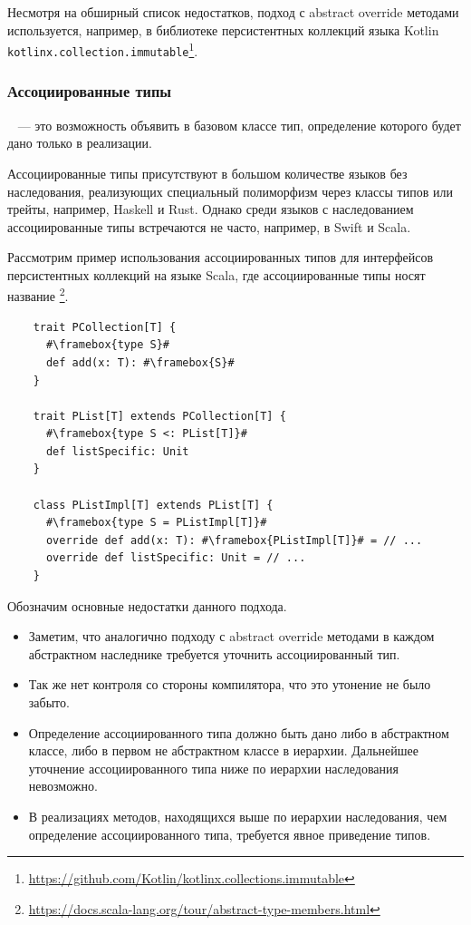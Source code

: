 Несмотря на обширный список недостатков, подход с abstract override методами используется, например, в библиотеке персистентных коллекций языка Kotlin \texttt{kotlinx.collection.immutable}\footnote{\url{https://github.com/Kotlin/kotlinx.collections.immutable}}.

\subsubsection{Ассоциированные типы}

\begin{definition}
    \label{def:assoc}
    ~\cite{chakravarty2005associated} --- это возможность объявить в базовом классе тип, определение которого будет дано только в реализации.
\end{definition}

Ассоциированные типы присутствуют в большом количестве языков без наследования, реализующих специальный полиморфизм через классы типов или трейты, например, Haskell и Rust.
Однако среди языков с наследованием ассоциированные типы встречаются не часто, например, в Swift и Scala.

Рассмотрим пример использования ассоциированных типов для интерфейсов персистентных коллекций на языке Scala, где ассоциированные типы носят название \footnote{\url{https://docs.scala-lang.org/tour/abstract-type-members.html}}.

\begin{verbatim}
    trait PCollection[T] {
      #\framebox{type S}#
      def add(x: T): #\framebox{S}#
    }

    trait PList[T] extends PCollection[T] {
      #\framebox{type S <: PList[T]}#
      def listSpecific: Unit
    }

    class PListImpl[T] extends PList[T] {
      #\framebox{type S = PListImpl[T]}#
      override def add(x: T): #\framebox{PListImpl[T]}# = // ...
      override def listSpecific: Unit = // ...
    }
\end{verbatim}

Обозначим основные недостатки данного подхода.

\begin{itemize}
    \item Заметим, что аналогично подходу с abstract override методами в каждом абстрактном наследнике требуется уточнить ассоциированный тип.
    \item Так же нет контроля со стороны компилятора, что это утонение не было забыто.
    \item Определение ассоциированного типа должно быть дано либо в абстрактном классе, либо в первом не абстрактном классе в иерархии.
    Дальнейшее уточнение ассоциированного типа ниже по иерархии наследования невозможно.
    \item В реализациях методов, находящихся выше по иерархии наследования, чем определение ассоциированного типа, требуется явное приведение типов.
\end{itemize}

